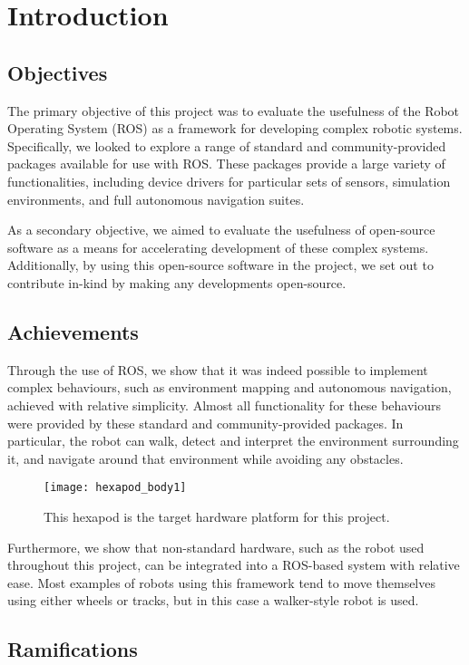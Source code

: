 \chapter{Introduction}


\section{Objectives}

The primary objective of this project was to evaluate the usefulness of the Robot Operating System (ROS) \cite{ros_site} as a framework for developing complex robotic systems. Specifically, we looked to explore a range of standard and community-provided packages available for use with ROS. These packages provide a large variety of functionalities, including device drivers for particular sets of sensors, simulation environments, and full autonomous navigation suites.

As a secondary objective, we aimed to evaluate the usefulness of open-source software as a means for accelerating development of these complex systems. Additionally, by using this open-source software in the project, we set out to contribute in-kind by making any developments open-source.


\section{Achievements}
Through the use of ROS, we show that it was indeed possible to implement complex behaviours, such as environment mapping and autonomous navigation, achieved with relative simplicity. Almost all functionality for these behaviours were provided by these standard and community-provided packages. In particular, the robot can walk, detect and interpret the environment surrounding it, and navigate around that environment while avoiding any obstacles.

\begin{figure}[!h]
    \centering
    \texttt{[image: hexapod\_body1]}
    \caption{This hexapod is the target hardware platform for this project.}
\end{figure}

Furthermore, we show that non-standard hardware, such as the robot used throughout this project, can be integrated into a ROS-based system with relative ease. Most examples of robots using this framework tend to move themselves using either wheels or tracks, but in this case a walker-style robot is used.


\section{Ramifications}